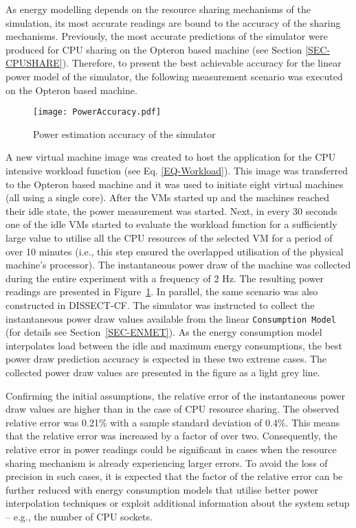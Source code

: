 \documentclass[sort, compress, 5p]{elsarticle}
\begin{document}
As energy modelling depends on the resource sharing mechanisms of the simulation, its most accurate readings are bound to the accuracy of the sharing mechanisms. Previously, the most accurate predictions of the simulator were produced for CPU sharing on the Opteron based machine (see Section \ref{SEC-CPUSHARE}). Therefore, to present the best achievable accuracy for the linear power model of the simulator, the following measurement scenario was executed on the Opteron based machine.

\begin{figure}[tb]
\center
\texttt{[image: PowerAccuracy.pdf]}
\caption{Power estimation accuracy of the simulator\label{FIG-PWTest}}
\end{figure}

A new virtual machine image was created to host the application for the CPU intensive workload function (see Eq. \ref{EQ-Workload}). This image was transferred to the Opteron based machine and it was used to initiate eight virtual machines (all using a single core).  After the VMs started up and the machines reached their idle state, the power measurement was started. Next, in every 30 seconds one of the idle VMs started to evaluate the workload function for a sufficiently large  value to utilise all the CPU resources of the selected VM for a period of over 10 minutes (i.e., this step ensured the overlapped utilisation of the physical machine's processor). The instantaneous power draw of the machine was collected during the entire experiment with a frequency of 2 Hz. The resulting power readings are presented in Figure~\ref{FIG-PWTest}. In parallel, the same scenario was also constructed in DISSECT-CF. The simulator was instructed to collect the instantaneous power draw values available from the linear \verb+Consumption Model+ (for details see Section~\ref{SEC-ENMET}). As the energy consumption model interpolates load between the idle and maximum energy consumptions, the best power draw prediction accuracy is expected in these two extreme cases. The collected power draw values are presented in the figure as a light grey line.

Confirming the initial assumptions, the relative error of the instantaneous power draw values are higher than in the case of CPU resource sharing. The observed relative error was 0.21\% with a sample standard deviation of 0.4\%. This means that the relative error was increased by a factor of over two. Consequently, the relative error in power readings could be significant in cases when the resource sharing mechanism is already experiencing larger errors. To avoid the loss of precision in such cases, it is expected that the factor of the relative error can be further reduced with energy consumption models that utilise better power interpolation techniques or exploit additional information about the system setup -- e.g., the number of CPU sockets.
\end{document}
